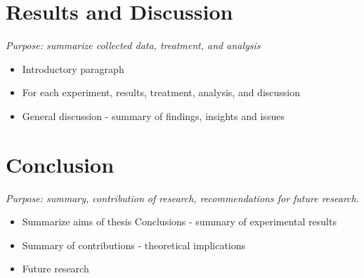 \section{Results and Discussion}
\label{resultsanddiscussion}

\emph{Purpose: summarize collected data, treatment, and analysis}

\begin{itemize}
\item Introductory paragraph

\item For each experiment, results, treatment, analysis, and discussion

\item General discussion - summary of findings, insights and issues

\end{itemize}

\section{Conclusion}
\label{conclusion}

\emph{Purpose: summary, contribution of research, recommendations for future research.}

\begin{itemize}
\item Summarize aims of thesis
Conclusions - summary of experimental results

\item Summary of contributions - theoretical implications

\item Future research

\end{itemize}

